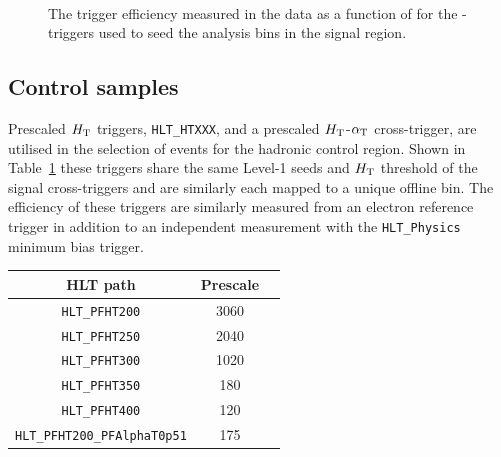 \begin{figure}[h!]
\begin{center}
     ~~
    \caption{
      The trigger efficiency measured in the data as a function of \alt for the \scalht-\alt triggers used to seed the analysis bins in the signal region.
    }
    \label{fig:alphat_turnons}
  \end{center} 
\end{figure}




\subsection{Control samples\label{sec:control_samples}}
Prescaled $\mbox{$H_\text{T}$}$ triggers, \verb!HLT_HTXXX!, and a prescaled 
$\mbox{$H_\text{T}$}$-$\alpha_{\text{T}}$ cross-trigger, are utilised in the 
selection of events for the hadronic control region. Shown 
in Table~\ref{tab:2015_Hadronic_Control_Triggers} these triggers share the same Level-1 
seeds and $\mbox{$H_\text{T}$}$ threshold of the signal cross-triggers and are similarly each mapped 
to a unique offline bin. The efficiency of these triggers are similarly measured from an electron 
reference trigger in addition to an independent measurement with the \verb!HLT_Physics! 
minimum bias trigger.


\begin{table}[h!]
\footnotesize
\centering
\begin{tabular}{c|cc} 
\hline
\hline
HLT path & \multicolumn{1}{c}{Prescale} \\
\hline
\texttt{HLT\_PFHT200} & 3060 \\
\texttt{HLT\_PFHT250} & 2040 \\
\texttt{HLT\_PFHT300} & 1020 \\
\texttt{HLT\_PFHT350} & 180  \\
\texttt{HLT\_PFHT400} & 120  \\
\texttt{HLT\_PFHT200\_PFAlphaT0p51} & 175 \\
\hline
\hline

\end{tabular}
\label{tab:2015_Hadronic_Control_Triggers}
\end{table}


